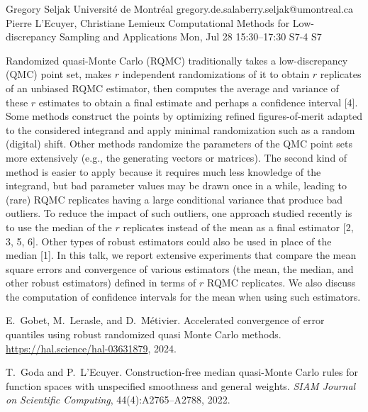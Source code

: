 \begin{talk}
  {Gregory Seljak}%
  {Universit\'e de Montr\'eal}%
  {gregory.de.salaberry.seljak@umontreal.ca}%
  {Pierre L'Ecuyer, Christiane Lemieux}%
  {Computational Methods for Low-discrepancy Sampling and Applications}%
  {}%
  {Mon, Jul 28 15:30–17:30}%
  {S7-4}%
  {S7}%

\medskip

Randomized quasi-Monte Carlo (RQMC) traditionally takes a low-discrepancy (QMC) point set,
makes $r$ independent randomizations of it to obtain $r$ replicates of an unbiased RQMC estimator, 
then computes the average and variance of these $r$ estimates to obtain a final estimate 
and perhaps a confidence interval [4]. 
Some methods construct the points by optimizing refined figures-of-merit adapted to the considered integrand
and apply minimal randomization such as a random (digital) shift.  Other methods randomize
the parameters of the QMC point sets more extensively (e.g., the generating vectors or matrices).
The second kind of method is easier to apply because it requires much less knowledge of the integrand,
but bad parameter values may be drawn once in a while, leading to (rare) RQMC replicates having 
a large conditional variance that produce bad outliers.
To reduce the impact of such outliers, one approach studied recently is to use the median 
of the $r$ replicates instead of the mean as a final estimator [2, 3, 5, 6].
Other types of robust estimators could also be used in place of the median [1].
In this talk, we report extensive experiments that compare the mean square errors 
and convergence of various estimators (the mean, the median, and other robust estimators) 
defined in terms of $r$ RQMC replicates.
We also discuss the computation of confidence intervals for the mean when using such estimators.

{
%
\item
E.~Gobet, M.~Lerasle, and D.~M{\'e}tivier.
Accelerated convergence of error quantiles using robust randomized
  quasi {Monte Carlo} methods.
\url{https://hal.science/hal-03631879}, 2024.

\item
T.~Goda and P.~L'Ecuyer.
Construction-free median quasi-{Monte Carlo} rules for function
  spaces with unspecified smoothness and general weights.
{\em {SIAM} Journal on Scientific Computing}, 44(4):A2765--A2788, 2022.

}
\end{talk}

